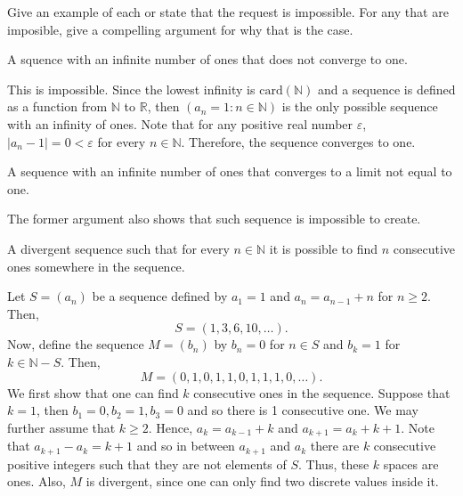 \documentclass[12pt]{article}
\newcommand{\N}{\mathbb{N}}
\newcommand{\R}{\mathbb{R}}
\newenvironment{problem}[2][Problem]{\begin{trivlist} \item[\hskip \labelsep {\bfseries #1}\hskip \labelsep {\bfseries #2.}]}{\end{trivlist}}
\newenvironment{solution}[1][Solution]{\begin{trivlist} \item[\hskip \labelsep {\bfseries #1}]}{\end{trivlist}}
\begin{document}
    \begin{problem}{2.2.4}
      Give an example of each or state that the request is impossible. For any that are imposible, give a compelling argument for why that is the case.
      \begin{enumerate}[label=(\alph*)]
	\item A squence with an infinite number of ones that does not converge to one.
    \begin{solution}
      This is impossible. Since the lowest infinity is $\mathrm{card}(\N)$ and a sequence is defined as a function from $\N$ to $\R$, then $(a_{n} = 1: n\in \N)$ is the only possible sequence with an infinity of ones. Note that for any positive real number $\varepsilon$, $|a_{n} -1| = 0 < \varepsilon$ for every $n\in\N$. Therefore, the sequence converges to one.
    \end{solution}
  \item A sequence with an infinite number of ones that converges to a limit not equal to one.
    \begin{solution}
      The former argument also shows that such sequence is impossible to create.
    \end{solution}
  \item A divergent sequence such that for every $n\in \N$ it is possible to find $n$ consecutive ones somewhere in the sequence.
    \begin{solution}
      Let $S=(a_{n})$ be a sequence defined by $a_{1}=1$ and $a_{n}=a_{n-1}+n$ for $n\geq 2$. Then,
    \begin{equation*}
      S=(1,3,6,10,\dots).
    \end{equation*}
    Now, define the sequence $M=(b_{n})$ by $b_{n} = 0$ for $n\in S$ and $b_{k}=1$ for $k\in \N-S$. Then, 
    \begin{equation*}
      M=(0,1,0,1,1,0,1,1,1,0,\dots).
    \end{equation*}
        We first show that one can find $k$ consecutive ones in the sequence. Suppose that $k=1$, then $b_{1}=0, b_{2}=1,b_{3}=0$  and so there is 1 consecutive one. We may further assume that $k\geq 2$. Hence, $a_{k}=a_{k-1}+k$ and $a_{k+1}=a_{k}+k+1$. Note that $a_{k+1}-a_{k} = k+1$ and so in between $a_{k+1}$ and $a_{k}$ there are $k$ consecutive positive integers such that they are not elements of $S$. Thus, these $k$ spaces are ones. Also, $M$ is divergent, since one can only find two discrete values inside it.
    \end{solution}
    \end{enumerate}
    \end{problem}
       
\end{document}
